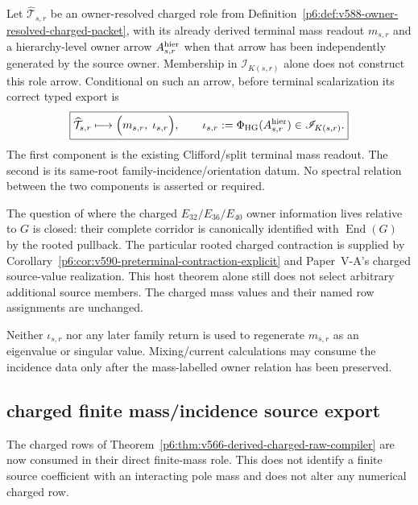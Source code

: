 \documentclass[12pt,a4paper]{article}
\begin{document}
\begin{proposition}
\label{p6:prop:v589-mass-incidence-sibling-export}
Let $\widehat{\mathcal T}_{s,r}$ be an owner-resolved charged role from
Definition~\ref{p6:def:v588-owner-resolved-charged-packet}, with its already
derived terminal mass readout $m_{s,r}$ and a hierarchy-level owner arrow
$A_{s,r}^{\rm hier}$ when that arrow has been independently generated by the
source owner.  Membership in $\mathscr I_{K(s,r)}$ alone does not construct
this role arrow.  Conditional on such an arrow, before terminal scalarization
its correct typed export is
\[
 \boxed{
 \widehat{\mathcal T}_{s,r}
 \longmapsto
 \Bigl(m_{s,r},\;\iota_{s,r}\Bigr),\qquad
 \iota_{s,r}:=\Phi_{\rm HG}(A_{s,r}^{\rm hier})\in\mathscr I_{K(s,r)}.}
\]
The first component is the existing Clifford/split terminal mass readout.  The
second is its same-root family-incidence/orientation datum.  No spectral
relation between the two components is asserted or required.
\end{proposition}

\begin{corollary}
\label{p6:cor:v589-hierarchy-host-retired}
The question of where the charged $E_{32}/E_{36}/E_{40}$ owner information
lives relative to $G$ is closed: their complete corridor is canonically
identified with $\operatorname{End}(G)$ by the rooted pullback.  The particular rooted charged contraction is supplied by
Corollary~\ref{p6:cor:v590-preterminal-contraction-explicit} and Paper~V-A's
charged source-value realization. This host theorem alone still does not
select arbitrary additional source members.  The charged mass values and their named row
assignments are unchanged.
\end{corollary}

\begin{remark}
\label{p6:rem:v589-no-svd-mass-reinterpretation}
Neither $\iota_{s,r}$ nor any later family return is used to regenerate
$m_{s,r}$ as an eigenvalue or singular value.  Mixing/current calculations may
consume the incidence data only after the mass-labelled owner relation has
been preserved.
\end{remark}

\subsection*{charged finite mass/incidence source export}
\label{p6:sec:v590-charged-mass-incidence-source-export}
The charged rows of Theorem~\ref{p6:thm:v566-derived-charged-raw-compiler}
are now consumed in their direct finite-mass role.  This does not identify a
finite source coefficient with an interacting pole mass and does not alter any
numerical charged row.
\end{document}
